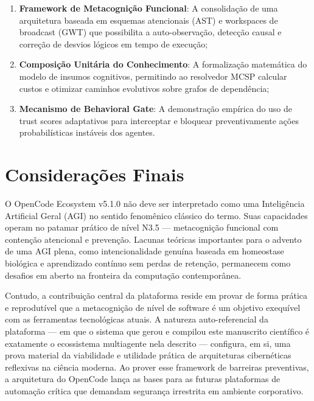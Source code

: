 \documentclass[12pt,a4paper,oneside]{abntex2}
\begin{document}
\begin{enumerate}
    \item \textbf{Framework de Metacognição Funcional}: A consolidação de uma arquitetura baseada em esquemas atencionais (AST) e workspaces de broadcast (GWT) que possibilita a auto-observação, detecção causal e correção de desvios lógicos em tempo de execução;
    \item \textbf{Composição Unitária do Conhecimento}: A formalização matemática do modelo de insumos cognitivos, permitindo ao resolvedor MCSP calcular custos e otimizar caminhos evolutivos sobre grafos de dependência;
    \item \textbf{Mecanismo de Behavioral Gate}: A demonstração empírica do uso de trust scores adaptativos para interceptar e bloquear preventivamente ações probabilísticas instáveis dos agentes.
\end{enumerate}

\section{Considerações Finais}

O OpenCode Ecosystem v5.1.0 não deve ser interpretado como uma Inteligência Artificial Geral (AGI) no sentido fenomênico clássico do termo. Suas capacidades operam no patamar prático de nível N3.5 — metacognição funcional com contenção atencional e prevenção. Lacunas teóricas importantes para o advento de uma AGI plena, como intencionalidade genuína baseada em homeostase biológica e aprendizado contínuo sem perdas de retenção, permanecem como desafios em aberto na fronteira da computação contemporânea.

Contudo, a contribuição central da plataforma reside em provar de forma prática e reprodutível que a metacognição de nível de software é um objetivo exequível com as ferramentas tecnológicas atuais. A natureza auto-referencial da plataforma — em que o sistema que gerou e compilou este manuscrito científico é exatamente o ecossistema multiagente nela descrito — configura, em si, uma prova material da viabilidade e utilidade prática de arquiteturas cibernéticas reflexivas na ciência moderna. Ao prover esse framework de barreiras preventivas, a arquitetura do OpenCode lança as bases para as futuras plataformas de automação crítica que demandam segurança irrestrita em ambiente corporativo.
\end{document}
